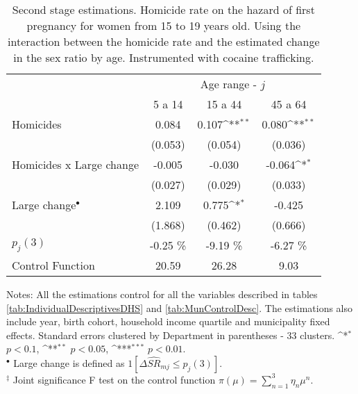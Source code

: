 \documentclass[a4paper,10pt,twocolumn,preprint,3p,authoryear]{elsarticle}
\def\sym#1{\ifmmode^{#1}\else\(^{#1}\)\fi}
\begin{document}
\begin{table}[h]
	\caption{\\ Second stage estimations. Homicide rate on the hazard of first pregnancy for women from 15 to 19 years old. Using the interaction between the homicide rate and the estimated change in the sex ratio by age. Instrumented with cocaine trafficking.}
	\footnotesize
	\begin{tabular}{lccc}
		\hline
		& \multicolumn{3}{c}{{Age range - $j$}} \\
			&	5 a 14 &	15 a 44 &	45 a 64 \\
		\hline
Homicides	&	       0.084         &	       0.107\sym{**} &	       0.080\sym{**} \\
	&	     (0.053)         &	     (0.054)         &	     (0.036)         \\
Homicides x Large change	&	      -0.005         &	      -0.030         &	      -0.064\sym{*}  \\
	&	     (0.027)         &	     (0.029)         &	     (0.033)         \\
Large change$^{\bullet}$ 	&	       2.109         &	       0.775\sym{*}  &	      -0.425         \\
	&	     (1.868)         &	     (0.462)         &	     (0.666)         \\
	\hline
	$p_{j}(3)$	&	-0.25 \%& 	-9.19 \%& 	-6.27 \% \\ 
Control Function	&	20.59&	26.28&	9.03 \\
\hline
	\end{tabular}
	\begin{minipage}[t]{1\columnwidth}%
		  \begin{spacing}{1}
		  \noindent 
		  {Notes: All the estimations control for all the variables described in tables \ref{tab:IndividualDescriptivesDHS} and \ref{tab:MunControlDesc}. The estimations also include year, birth cohort, household income quartile and municipality fixed effects. Standard errors clustered by Department in parentheses - 33 clusters. \sym{*} $p<0.1$, \sym{**} $p<0.05$, \sym{***} $p<0.01$. \\
			 $^{\bullet}$ Large change is defined as $1\left[\Delta \hat{SR}_{mj} \leq p_{j}\left( 3 \right)\right]$.   \\
			 $^{\ddagger}$ Joint significance F test on the control function $\pi\left( \mu \right) = \sum_{n=1}^{3}\eta_{n}\mu^{n}$.
		 } 		 
		  \end{spacing}
	  \end{minipage}

	\label{tab:SSHomRateSRChange}
\end{table}
\end{document}
